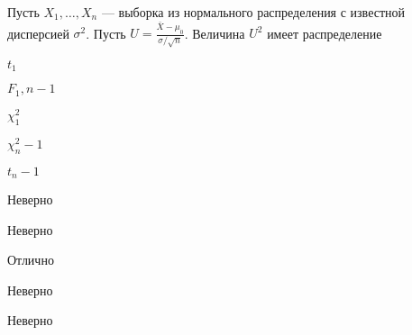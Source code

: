 
\begin{question}
Пусть \(X_1,\ldots,X_n\) — выборка из нормального распределения с
известной дисперсией \(\sigma^2\). Пусть
\(U = \frac{\bar{X}-\mu_0}{\sigma/\sqrt{n}}\). Величина \(U^2\) имеет
распределение
\begin{answerlist}
  \item \(t_1\)
  \item \(F_1,n-1\)
  \item \(\chi^2_1\)
  \item \(\chi^2_n-1\)
  \item \(t_n-1\)
\end{answerlist}
\end{question}

\begin{solution}
\begin{answerlist}
  \item Неверно
  \item Неверно
  \item Отлично
  \item Неверно
  \item Неверно
\end{answerlist}
\end{solution}

